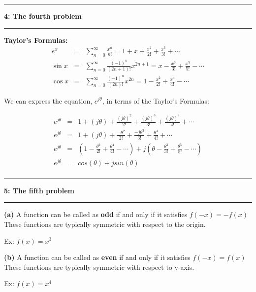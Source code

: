 \documentclass[11pt]{article}
\newcommand\question[2]{\vspace{.25in}\hrule\textbf{#1: #2}\vspace{.5em}\hrule\vspace{.10in}}
\renewcommand\part[1]{\vspace{.10in}\textbf{(#1)}}
\newcommand\tab[1][1cm]{\hspace*{#1}}
\begin{document}
\question{4}{The fourth problem}
\tab \textbf{Taylor's Formulas:}
	\begin{eqnarray*}
		e^{x} &=& \sum^{\infty}_{n=0} \frac{x^n}{n!} = 1 + x + \frac{x^2}{2!} + \frac{x^3}{3!} + \cdots \\
		\sin x &=& \sum^{\infty}_{n=0} \frac{(-1)^n}{(2n+1)!} x^{2n+1} =  x - \frac{x^3}{3!} + \frac{x^5}{5!} - \cdots \\
		\cos x &=& \sum^{\infty}_{n=0} \frac{(-1)^n}{(2n)!} x^{2n}=  1 - \frac{x^2}{2!} + \frac{x^4}{4!} - \cdots
	\end{eqnarray*}

\tab We can express the equation, $e^{j \theta}$, in terms of the Taylor's Formulas:
	
	\begin{eqnarray*}
		e^{j \theta} &=& 1 + (j \theta) + \frac{(j \theta)^2}{2!} + \frac{(j \theta)^3}{3!} + \frac{(j \theta)^4}{4!} + \cdots \\
		e^{j \theta} &=& 1 + (j \theta) + \frac{-\theta^2}{2!} + \frac{-j \theta^3}{3!} + \frac{ \theta^4}{4!} + \cdots \\
		e^{j \theta} &=& (1 - \frac{\theta^2}{2!} + \frac{ \theta^4}{4!} - \cdots) + j (\theta -\frac{ \theta^3}{3!} +\frac{ \theta^5}{5!} - \cdots) \\
		e^{j \theta} &=& cos(\theta) + j sin(\theta) \\
	\end{eqnarray*}
	
\question{5}{The fifth problem}

\part{a} A function can be called as \textbf{odd} if and only if it satisfies $f(-x) = -f(x)$ These functions are typically symmetric with respect to the origin. 
\begin{center}
	Ex: $ f(x) = x^3 $
\end{center}

\part{b} A function can be called as \textbf{even} if and only if it satisfies $f(-x) = f(x)$ These functions are typically symmetric with respect to y-axis. 

\begin{center}
	Ex: $ f(x) = x^4 $
\end{center}
\end{document}
